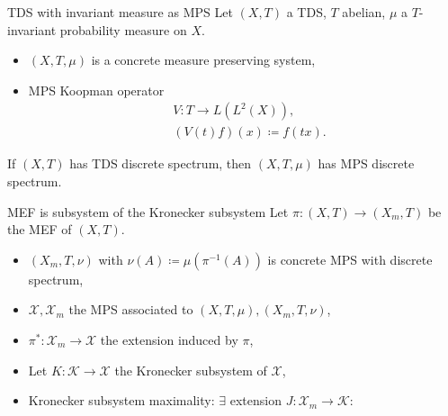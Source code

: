 \begin{frame}{TDS with invariant measure as MPS}
Let $(X,T)$ a TDS, $T$ abelian, $\mu$ a $T$-invariant probability measure on $X$.
\begin{itemize}
  \item $(X,T,\mu)$ is a concrete measure preserving system,
    \pause
  \item MPS Koopman operator
\begin{equation*}
  \begin{split}
    &V : T \to L(L^2(X)),\\
    & (V(t) f)(x) \coloneq f (t x).
  \end{split}
\end{equation*}
\end{itemize}
\pause
\begin{proposition}
  If $(X,T)$ has TDS discrete spectrum, then $(X,T,\mu)$ has MPS discrete spectrum.
  \end{proposition}
\end{frame}
\begin{frame}[fragile]{MEF is subsystem of the Kronecker subsystem}
  Let $\pi : (X,T) \to (X_m,T)$ be the MEF of $(X,T)$.
  \begin{itemize}
    \item $(X_m,T, \nu)$ with $\nu(A)\coloneq  \mu(\pi^{-1}(A))$ is concrete MPS with discrete spectrum,
      \pause
  \item $\mathcal{X}, \mathcal{X}_m$ the MPS associated to $(X,T,\mu), (X_m,T,\nu)$,
  \item $\pi^* : \mathcal{X}_m \to \mathcal{X}$ the extension induced by $\pi$,
\pause
  \item Let $K: \mathcal{K} \to \mathcal{X}$ the Kronecker subsystem of $\mathcal{X}$,
  \item Kronecker subsystem maximality: $\exists$ extension $J: \mathcal{X}_m \to \mathcal{K}$:
\end{itemize}
  \begin{center}
  \end{center}
  \end{frame}

